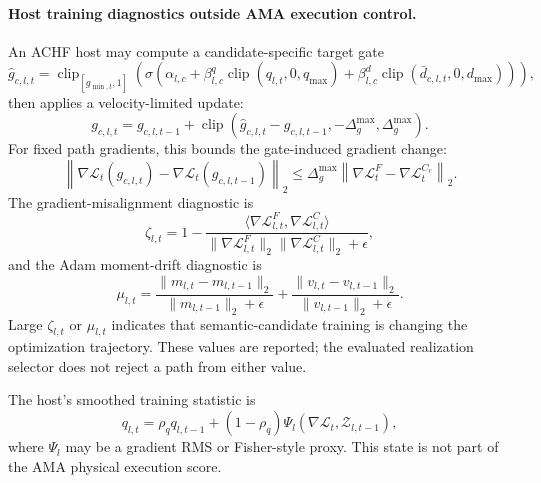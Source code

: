 \documentclass{article}
\begin{document}
\paragraph{Host training diagnostics outside AMA execution control.}
An ACHF host may compute a candidate-specific target gate
\begin{equation}
\hat{g}_{c,l,t}
=
\operatorname{clip}_{[g_{\min,t},1]}
\left(
\sigma\left(
\alpha_{l,c}
+
\beta^{q}_{l,c}\operatorname{clip}(q_{l,t},0,q_{\max})
+
\beta^{d}_{l,c}\operatorname{clip}(\bar{d}_{c,l,t},0,d_{\max})
\right)
\right),
\label{eq:ama-target-gate}
\end{equation}
then applies a velocity-limited update:
\begin{equation}
g_{c,l,t}
=
g_{c,l,t-1}
+
\operatorname{clip}
\left(
\hat{g}_{c,l,t}-g_{c,l,t-1},
-\Delta_g^{\max},
\Delta_g^{\max}
\right).
\label{eq:ama-gate-update}
\end{equation}
For fixed path gradients, this bounds the gate-induced gradient change:
\begin{equation}
\left\|
\nabla\mathcal{L}_{t}(g_{c,l,t})
-
\nabla\mathcal{L}_{t}(g_{c,l,t-1})
\right\|_2
\le
\Delta_g^{\max}
\left\|
\nabla\mathcal{L}^{F}_{t}
-
\nabla\mathcal{L}^{C_c}_{t}
\right\|_2 .
\label{eq:ama-gradient-bound}
\end{equation}
The gradient-misalignment diagnostic is
\begin{equation}
\zeta_{l,t}
=
1-
\frac{
\langle
\nabla\mathcal{L}^{F}_{l,t},
\nabla\mathcal{L}^{C}_{l,t}
\rangle
}{
\|\nabla\mathcal{L}^{F}_{l,t}\|_2
\|\nabla\mathcal{L}^{C}_{l,t}\|_2
+\epsilon
},
\label{eq:ama-grad-cosine}
\end{equation}
and the Adam moment-drift diagnostic is
\begin{equation}
\mu_{l,t}
=
\frac{\|m_{l,t}-m_{l,t-1}\|_2}{\|m_{l,t-1}\|_2+\epsilon}
+
\frac{\|v_{l,t}-v_{l,t-1}\|_2}{\|v_{l,t-1}\|_2+\epsilon}.
\label{eq:ama-moment-drift}
\end{equation}
Large $\zeta_{l,t}$ or $\mu_{l,t}$ indicates that semantic-candidate training
is changing the optimization trajectory. These values are reported; the
evaluated realization selector does not reject a path from either value.

The host's smoothed training statistic is
\begin{equation}
q_{l,t}
=
\rho_q q_{l,t-1}
+
(1-\rho_q)
\Psi_l
\left(
\nabla \mathcal{L}_t,
\mathcal{Z}_{l,t-1}
\right),
\label{eq:ama-host-stat-update}
\end{equation}
where $\Psi_l$ may be a gradient RMS or Fisher-style proxy. This state is not
part of the AMA physical execution score.
\end{document}
